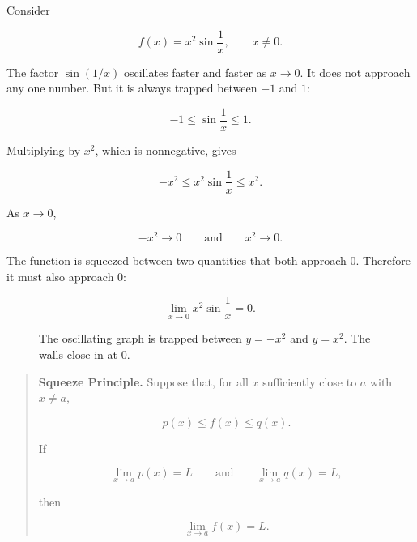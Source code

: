 Consider

\[
f(x)=x^2\sin\frac1x,
\qquad x\neq0.
\]

The factor \(\sin(1/x)\) oscillates faster and faster as \(x\to0\).  It does not approach any one number.  But it is always trapped between \(-1\) and \(1\):

\[
-1\le \sin\frac1x\le 1.
\]

Multiplying by \(x^2\), which is nonnegative, gives

\[
-x^2\le x^2\sin\frac1x\le x^2.
\]

As \(x\to0\),

\[
-x^2\to0
\qquad\text{and}\qquad
x^2\to0.
\]

The function is squeezed between two quantities that both approach \(0\).  Therefore it must also approach \(0\):

\[
\lim_{x\to0}x^2\sin\frac1x=0.
\]

\begin{figure}[h]
\centering
{}
\caption{The oscillating graph is trapped between \(y=-x^2\) and \(y=x^2\).  The walls close in at \(0\).}
\label{fig:squeeze-x2-sin}
\end{figure}

\begin{quote}
\textbf{Squeeze Principle.}
Suppose that, for all \(x\) sufficiently close to \(a\) with \(x\neq a\),

\[
p(x)\le f(x)\le q(x).
\]

If

\[
\lim_{x\to a}p(x)=L
\qquad\text{and}\qquad
\lim_{x\to a}q(x)=L,
\]

then

\[
\lim_{x\to a}f(x)=L.
\]
\end{quote}

